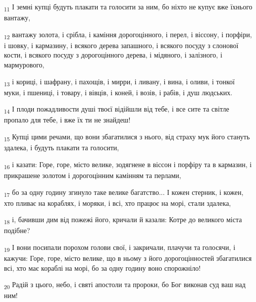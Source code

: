 \begin{tcolorbox}
\textsubscript{11} І земні купці будуть плакати та голосити за ним, бо ніхто не купує вже їхнього вантажу,
\end{tcolorbox}
\begin{tcolorbox}
\textsubscript{12} вантажу золота, і срібла, і каміння дорогоцінного, і перел, і віссону, і порфіри, і шовку, і кармазину, і всякого дерева запашного, і всякого посуду з слонової кости, і всякого посуду з дорогоцінного дерева, і мідяного, і залізного, і мармурового,
\end{tcolorbox}
\begin{tcolorbox}
\textsubscript{13} і кориці, і шафрану, і пахощів, і мирри, і ливану, і вина, і оливи, і тонкої муки, і пшениці, і товару, і вівців, і коней, і возів, і рабів, і душ людських.
\end{tcolorbox}
\begin{tcolorbox}
\textsubscript{14} І плоди пожадливости душі твоєї відійшли від тебе, і все сите та світле пропало для тебе, і вже їх ти не знайдеш!
\end{tcolorbox}
\begin{tcolorbox}
\textsubscript{15} Купці цими речами, що вони збагатилися з нього, від страху мук його стануть здалека, і будуть плакати та голосити,
\end{tcolorbox}
\begin{tcolorbox}
\textsubscript{16} і казати: Горе, горе, місто велике, зодягнене в віссон і порфіру та в кармазин, і прикрашене золотом і дорогоцінним камінням та перлами,
\end{tcolorbox}
\begin{tcolorbox}
\textsubscript{17} бо за одну годину згинуло таке велике багатство... І кожен стерник, і кожен, хто пливає на кораблях, і моряки, і всі, хто працює на морі, стали здалека,
\end{tcolorbox}
\begin{tcolorbox}
\textsubscript{18} і, бачивши дим від пожежі його, кричали й казали: Котре до великого міста подібне?
\end{tcolorbox}
\begin{tcolorbox}
\textsubscript{19} І вони посипали порохом голови свої, і закричали, плачучи та голосячи, і кажучи: Горе, горе, місто велике, що в ньому з його дорогоцінностей збагатилися всі, хто має кораблі на морі, бо за одну годину воно спорожніло!
\end{tcolorbox}
\begin{tcolorbox}
\textsubscript{20} Радій з цього, небо, і святі апостоли та пророки, бо Бог виконав суд ваш над ним!
\end{tcolorbox}
